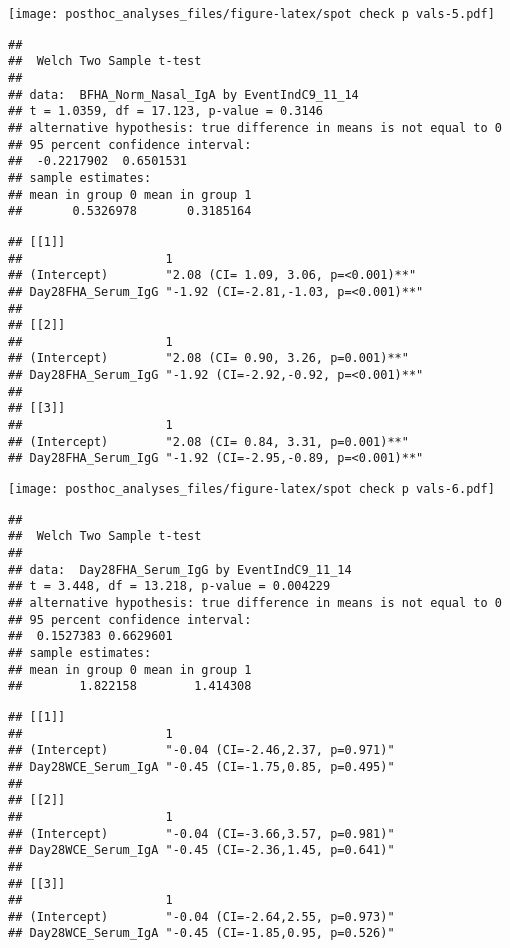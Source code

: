 \documentclass[
]{article}
\begin{document}
\texttt{[image: posthoc\_analyses\_files/figure-latex/spot check p vals-5.pdf]}

\begin{verbatim}
## 
##  Welch Two Sample t-test
## 
## data:  BFHA_Norm_Nasal_IgA by EventIndC9_11_14
## t = 1.0359, df = 17.123, p-value = 0.3146
## alternative hypothesis: true difference in means is not equal to 0
## 95 percent confidence interval:
##  -0.2217902  0.6501531
## sample estimates:
## mean in group 0 mean in group 1 
##       0.5326978       0.3185164
\end{verbatim}

\begin{verbatim}
## [[1]]
##                    1                                   
## (Intercept)        "2.08 (CI= 1.09, 3.06, p=<0.001)**" 
## Day28FHA_Serum_IgG "-1.92 (CI=-2.81,-1.03, p=<0.001)**"
## 
## [[2]]
##                    1                                   
## (Intercept)        "2.08 (CI= 0.90, 3.26, p=0.001)**"  
## Day28FHA_Serum_IgG "-1.92 (CI=-2.92,-0.92, p=<0.001)**"
## 
## [[3]]
##                    1                                   
## (Intercept)        "2.08 (CI= 0.84, 3.31, p=0.001)**"  
## Day28FHA_Serum_IgG "-1.92 (CI=-2.95,-0.89, p=<0.001)**"
\end{verbatim}

\texttt{[image: posthoc\_analyses\_files/figure-latex/spot check p vals-6.pdf]}

\begin{verbatim}
## 
##  Welch Two Sample t-test
## 
## data:  Day28FHA_Serum_IgG by EventIndC9_11_14
## t = 3.448, df = 13.218, p-value = 0.004229
## alternative hypothesis: true difference in means is not equal to 0
## 95 percent confidence interval:
##  0.1527383 0.6629601
## sample estimates:
## mean in group 0 mean in group 1 
##        1.822158        1.414308
\end{verbatim}

\begin{verbatim}
## [[1]]
##                    1                               
## (Intercept)        "-0.04 (CI=-2.46,2.37, p=0.971)"
## Day28WCE_Serum_IgA "-0.45 (CI=-1.75,0.85, p=0.495)"
## 
## [[2]]
##                    1                               
## (Intercept)        "-0.04 (CI=-3.66,3.57, p=0.981)"
## Day28WCE_Serum_IgA "-0.45 (CI=-2.36,1.45, p=0.641)"
## 
## [[3]]
##                    1                               
## (Intercept)        "-0.04 (CI=-2.64,2.55, p=0.973)"
## Day28WCE_Serum_IgA "-0.45 (CI=-1.85,0.95, p=0.526)"
\end{verbatim}
\end{document}
